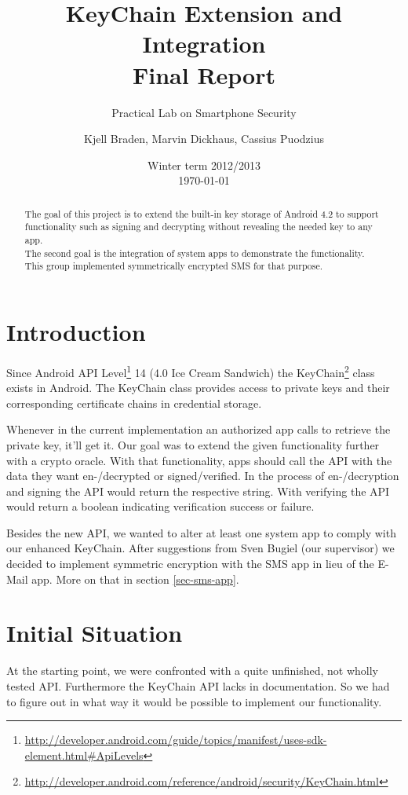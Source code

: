 \documentclass[a4paper,draft]{scrartcl}
\title{KeyChain Extension and Integration\\
	Final Report}
\subtitle{Practical Lab on Smartphone Security}
\author{Kjell Braden, Marvin Dickhaus, Cassius Puodzius}
\date{Winter term 2012/2013\\\today}
\begin{document}
\maketitle

\begin{abstract}
	The goal of this project is to extend the built-in key storage of Android 4.2 to support functionality such as signing and decrypting without revealing the needed key to any app.\\
	The second goal is the integration of system apps to demonstrate the functionality. This group implemented symmetrically encrypted SMS for that purpose.
\end{abstract}

\tableofcontents
\pagebreak[4]

\section{Introduction}
	Since Android API Level\footnote{\url{http://developer.android.com/guide/topics/manifest/uses-sdk-element.html\#ApiLevels}} 14 (4.0 Ice Cream Sandwich) the KeyChain\footnote{\url{http://developer.android.com/reference/android/security/KeyChain.html}} class exists in Android. The KeyChain class provides access to private keys and their corresponding certificate chains in credential storage.

	Whenever in the current implementation an authorized app calls to retrieve the private key, it'll get it. Our goal was to extend the given functionality further with a crypto oracle. With that functionality, apps should call the API with the data they want en-/decrypted or signed/verified. In the process of en-/decryption and signing the API would return the respective string. With verifying the API would return a boolean indicating verification success or failure.
	
	Besides the new API, we wanted to alter at least one system app to comply with our enhanced KeyChain. After suggestions from Sven Bugiel (our supervisor) we decided to implement symmetric encryption with the SMS app in lieu of the E-Mail app. More on that in section \ref{sec-sms-app}.

\section{Initial Situation}
	At the starting point, we were confronted with a quite unfinished, not wholly tested API. Furthermore the KeyChain API lacks in documentation. So we had to figure out in what way it would be possible to implement our functionality.
\end{document}
